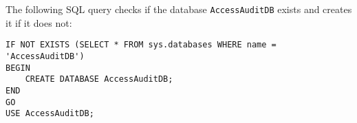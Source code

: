 


The following SQL query checks if the database \texttt{AccessAuditDB} exists and creates it if it does not:

\begin{lstlisting}[style=sql, caption={SQL Query to Create Database}, label={lst:sql-create-db}]
IF NOT EXISTS (SELECT * FROM sys.databases WHERE name = 'AccessAuditDB')
BEGIN
    CREATE DATABASE AccessAuditDB;
END
GO
USE AccessAuditDB;
\end{lstlisting}

